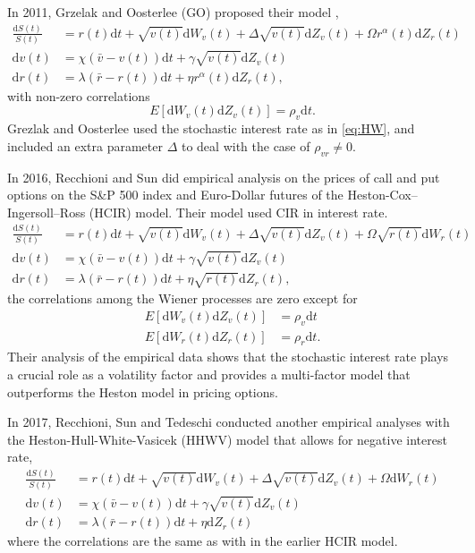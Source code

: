 \documentclass[12pt]{report}
\begin{document}
In 2011, Grzelak and Oosterlee (GO) proposed their model \cite{grzelak2011heston},
\begin{align}
\frac{\mathrm{d} S(t)}{S(t)} &= r(t)\mathrm{d} t+ \sqrt{v(t)} \mathrm{d} W_{v}(t)+ \Delta \sqrt{v(t)} \mathrm{d} Z_{v}(t)
 +\Omega {r^\alpha(t)} \mathrm{d} Z_{r}(t)  \\
\mathrm{d} v(t) &= \chi\left(\bar{v}-v(t)\right) \mathrm{d} t+\gamma \sqrt{v(t)} \mathrm{d} Z_v(t) \\
\mathrm{d} r(t) &= \lambda\left(\bar{r}-r(t)\right) \mathrm{d} t+\eta {r^\alpha(t)} \mathrm{d} Z_{r}(t),
\end{align}
with non-zero correlations 
\begin{equation}
E\left[\mathrm{d} W_{v}(t) \mathrm{d} Z_{v}(t)\right] =\rho_{v} \mathrm{d} t.
\end{equation}
Grezlak and Oosterlee used the stochastic interest rate as in \ref{eq:HW}, and included an extra parameter $\Delta$ to deal with the case of $\rho_{vr} \neq 0$.

In 2016, Recchioni and Sun \cite{recchioni2016explicitly} did empirical analysis on the prices of call and put options on the S\&P 500 index and Euro-Dollar futures of the Heston-Cox–Ingersoll–Ross (HCIR) model. Their model used CIR in interest rate.
\begin{align}
\frac{\mathrm{d} S(t)}{S(t)} &=  r(t) \mathrm{d} t + \sqrt{v(t)} \mathrm{d} W_{v}(t) +  \Delta \sqrt{v(t)} \mathrm{d} Z_{v}(t)
 + \Omega \sqrt{r(t)} \mathrm{d} W_{r}(t)  \\
\mathrm{d} v(t) &= \chi\left(\bar{v}-v(t)\right) \mathrm{d} t+\gamma \sqrt{v(t)} \mathrm{d} Z_v(t) \\
\mathrm{d} r(t) &= \lambda\left(\bar{r}-r(t)\right) \mathrm{d} t+\eta \sqrt{r(t)}\mathrm{d} Z_{r}(t),
\end{align}
the correlations among the Wiener processes are zero except for
\begin{align}
E\left[\mathrm{d} W_{v}(t) \mathrm{d} Z_{v}(t)\right] &=\rho_{v} \mathrm{d} t \\
E\left[\mathrm{d} W_{r}(t) \mathrm{d} Z_{r}(t)\right] &=\rho_{r} \mathrm{d} t.
\end{align}
Their analysis of the empirical data shows that the stochastic interest rate plays a crucial role as a volatility factor and provides a multi-factor model that outperforms the Heston model in pricing options.

In 2017, Recchioni, Sun and Tedeschi \cite{recchioni2017can} conducted another empirical analyses with the Heston-Hull-White-Vasicek (HHWV) model that allows for negative interest rate,
\begin{align}
\frac{\mathrm{d} S(t)}{S(t)} &= r(t) \mathrm{d} t + \sqrt{v(t)} \mathrm{d} W_{v}(t) + \Delta \sqrt{v(t)} \mathrm{d} Z_{v}(t)
 + \Omega  \mathrm{d} W_{r}(t)  \\
\mathrm{d} v(t) &= \chi\left(\bar{v}-v(t)\right) \mathrm{d} t+\gamma \sqrt{v(t)} \mathrm{d} Z_v(t) \\
\mathrm{d} r(t) &= \lambda\left(\bar{r}-r(t)\right) \mathrm{d} t+\eta \mathrm{d} Z_{r}(t)
\end{align}
where the correlations are the same as with in the earlier HCIR model.
\end{document}
